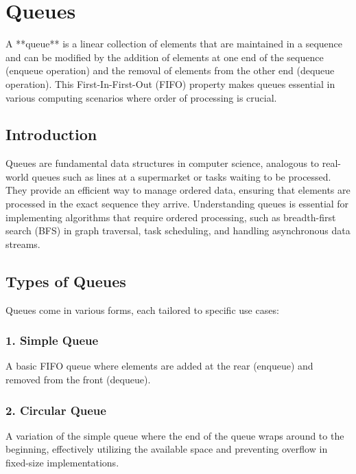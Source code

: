 
\chapter{Queues}
\label{chap:Queues}

A **queue** is a linear collection of elements that are maintained in a sequence and can be modified by the addition of elements at one end of the sequence (enqueue operation) and the removal of elements from the other end (dequeue operation). This First-In-First-Out (FIFO) property makes queues essential in various computing scenarios where order of processing is crucial.

\section{Introduction}

Queues are fundamental data structures in computer science, analogous to real-world queues such as lines at a supermarket or tasks waiting to be processed. They provide an efficient way to manage ordered data, ensuring that elements are processed in the exact sequence they arrive. Understanding queues is essential for implementing algorithms that require ordered processing, such as breadth-first search (BFS) in graph traversal, task scheduling, and handling asynchronous data streams.

\section{Types of Queues}

Queues come in various forms, each tailored to specific use cases:

\subsection*{1. Simple Queue}
A basic FIFO queue where elements are added at the rear (enqueue) and removed from the front (dequeue).

\subsection*{2. Circular Queue}
A variation of the simple queue where the end of the queue wraps around to the beginning, effectively utilizing the available space and preventing overflow in fixed-size implementations.

